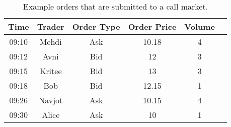 
\begin{table}[t]
\centering
\scriptsize
\begin{tabular}{|c|c|c|c|c|c}
\hline

\textbf{Time}& \textbf{Trader}   & \textbf{Order Type} & \textbf{Order Price}   & \textbf{Volume}     \\ \hline

09:10   & Mehdi & Ask & 10.18 &4              \\ \hline
09:12   & Avni & Bid & 12 &3              \\ \hline
09:15   & Kritee & Bid & 13 &3              \\ \hline
09:18   & Bob & Bid & 12.15 &1              \\ \hline
09:26   & Navjot & Ask & 10.15 &4              \\ \hline
09:30   & Alice & Ask & 10 &1              \\ \hline

\end{tabular}
\caption{\footnotesize{Example orders that are submitted to a call market}.
\label{tab:cmsample}}
\end{table}
